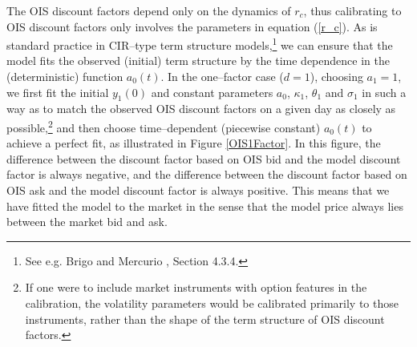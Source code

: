 \documentclass[12pt,a4paper]{article}
\renewcommand{\cite}{\citeyear}
\theoremstyle{plain}
\numberwithin{equation}{section}
\begin{document}
The OIS discount factors depend only on the dynamics of $r_c$, thus calibrating to OIS discount factors only involves the parameters in equation (\ref{r_c}). As is standard practice in CIR--type term structure models,\footnote{See e.g. Brigo and Mercurio \cite{BM2006}, Section 4.3.4.} we can ensure that the model fits the observed (initial) term structure by the time dependence in the (deterministic) function $a_0(t)$. In the one--factor case ($d=1$), choosing $a_1=1$, we first fit the initial $y_1(0)$ and constant parameters $a_0$, $\kappa_1$, $\theta_1$ and $\sigma_1$ in such a way as to match the observed OIS discount factors on a given day as closely as possible,\footnote{If one were to include market instruments with option features in the calibration, the volatility parameters would be calibrated primarily to those instruments, rather than the shape of the term structure of OIS discount factors.} and then choose time--dependent (piecewise constant) $a_0(t)$ to achieve a perfect fit, as illustrated in Figure \ref{OIS1Factor}. In this figure, the difference between the discount factor based on OIS bid and the model discount factor is always negative, and the difference between the discount factor based on OIS ask and the model discount factor is always positive. This means that we have fitted the model to the market in the sense that the model price always lies between the market bid and ask.
\end{document}
